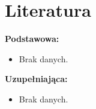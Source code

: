 \documentclass[12pt, a4paper]{article}
\begin{document}
\section{Literatura}

\textbf{Podstawowa:}
\begin{itemize}
  \item Brak danych.
\end{itemize}

\textbf{Uzupełniająca:}
\begin{itemize}
  \item Brak danych.
\end{itemize}
\end{document}
